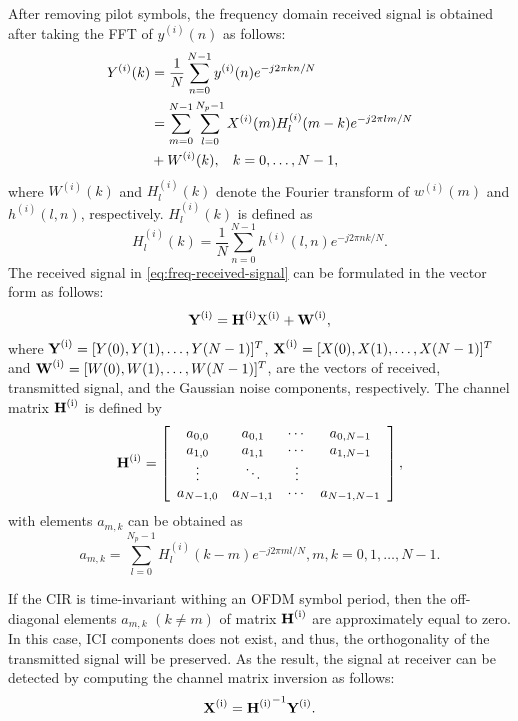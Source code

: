 \documentclass[AMA]{WileyNJD-v1}
\begin{document}
After removing pilot symbols, the frequency domain received signal is obtained after taking the FFT of $y^{(i)}(n)$ as follows:
%
\begin{equation}\label{eq:freq-received-signal}
	\begin{split}
	Y^{(i)}(k)&=\dfrac{1}{N} \sum_{n=0}^{N-1} y^{(i)}(n)e^{-j2\pi kn/N}\qquad\\
	&= \sum_{m=0}^{N-1}\sum_{l=0}^{N_p-1} X^{(i)}(m)H^{(i)}_{l}(m-k) e^{-j2\pi lm/N}  \\
	& + W^{(i)}(k), \hspace{0.3cm}k=0,\dots,N-1,
	\end{split}
\end{equation} 
%
where $W^{(i)}(k)$ and $H^{(i)}_l(k)$ denote the Fourier transform of $w^{(i)}(m)$ and $h^{(i)}(l,n)$, respectively. $H^{(i)}_{l}(k)$ is defined as
%
\begin{equation}\label{eq:fft-of-CIR}
	H^{(i)}_{l}(k)=\frac{1}{N} \sum_{n=0}^{N-1} h^{(i)}(l,n)e^{-j2\pi nk/N}.
\end{equation}
%
The received signal in \eqref{eq:freq-received-signal} can be formulated in the vector form as follows:
%
\begin{equation}\label{eq:vector-sinal}
	\rm {\textbf Y^{(i)}}= \rm{\textbf H^{(i)} X^{(i)}} +\rm {\textbf W^{(i)}}, 
\end{equation}
%
where ${\rm{\textbf Y^{(i)}}}=[Y(0),Y(1), \dots,Y(N-1)]^{T}$,  ${\rm {\textbf X^{(i)}}} =[X(0), X(1), \dots,X(N-1)]^{T}$ and  ${\rm {\textbf W^{(i)}}}=[W(0),W(1), \dots, W(N-1)]^{T}$, are the vectors of received, transmitted signal, and the Gaussian noise components, respectively. The channel matrix $\rm{\textbf H^{(i)}}$ is defined by
%
\begin{equation}\label{eq:matrix-channel}
	\rm{\textbf H^{(i)}}=\left[\begin{array}{cccc}
	a_{0,0}& a_{0,1} &  \cdots &  a_{0,N-1} \\
	a_{1,0}&  a_{1,1}&  \cdots &  a_{1,N-1}  \\
	\vdots &  \ddots&  \vdots \\
	a_{N-1,0}&  a_{N-1,1}&  \cdots &  a_{N-1,N-1}
	\end{array}\right],
\end{equation}
%
with elements $a_{m,k}$ can be obtained as 
%
\begin{equation*}
a_{m,k}=\sum_{l=0}^{N_p-1}H^{(i)}_l(k-m) e^{-j2\pi ml/N},m,k=0,1,\dots,N-1.
\end{equation*}
%
	
If the CIR is time-invariant withing an OFDM symbol period, then the off-diagonal elements $a_{m,k}$ $(k\neq m)$ of matrix $\rm{\textbf H^{(i)}}$ are approximately equal to zero. In this case, ICI components does not exist, and thus, the orthogonality of the transmitted signal will be preserved. As the result, the signal at receiver can be detected by computing the channel matrix inversion as follows:
%
\begin{equation}\label{eq:matrix-inverse}
\rm {\textbf X^{(i)}}= \rm {\textbf H^{(i)}}^{-1}{\rm {\textbf Y^{(i)}}}.
\end{equation}
%
	
\end{document}
